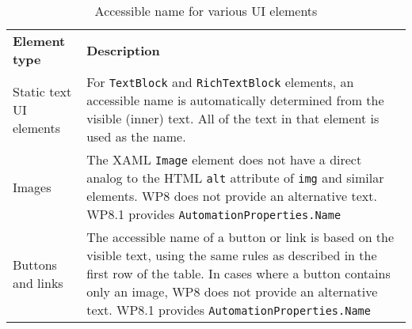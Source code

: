 \begin{table}[htbp]
  \centering
  \caption{Accessible name for various UI elements}
    \label{tab:accessibleNameWP8}%
    \renewcommand{\arraystretch}{1.2}
    \begin{tabularx}{\textwidth}{l|X}
    \rowcolor{mygray}
    \textbf{Element type} & \textbf{Description} \\
    Static text UI elements & For \texttt{TextBlock} and \texttt{RichTextBlock} elements, an accessible name is automatically determined from the visible (inner) text. All of the text in that element is used as the name. \\ \hline
    Images & The XAML \texttt{Image} element does not have a direct analog to the HTML \texttt{alt} attribute of \texttt{img} and similar elements. WP8 does not provide an alternative text. WP8.1 provides \texttt{AutomationProperties.Name} \\ \hline
    Buttons and links & The accessible name of a button or link is based on the visible text, using the same rules as described in the first row of the table. In cases where a button contains only an image, WP8 does not provide an alternative text. WP8.1 provides \texttt{AutomationProperties.Name} \\
    \end{tabularx}%
\end{table}%
